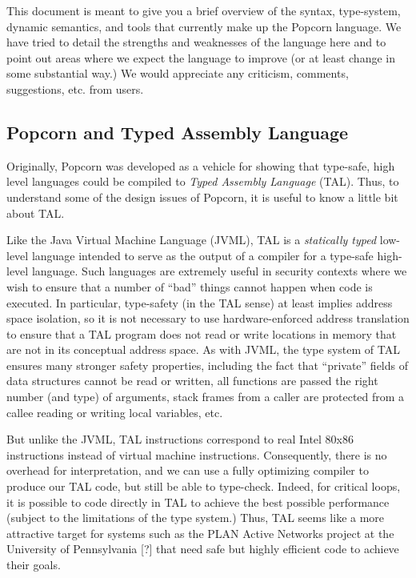 \documentclass[titlepage,10pt]{article}
\begin{document}
This document is meant to give you a brief overview of the syntax,
type-system, dynamic semantics, and tools that currently make up the
Popcorn language.  We have tried to detail the strengths and weaknesses
of the language here and to point out areas where we expect the language
to improve (or at least change in some substantial way.)  We would
appreciate any criticism, comments, suggestions, etc. from users.

\subsection{Popcorn and Typed Assembly Language}

Originally, Popcorn was developed as a vehicle for showing that
type-safe, high level languages could be compiled to \textit{Typed
Assembly Language} (TAL).   Thus, to understand some of the design
issues of Popcorn, it is useful to know a little bit about TAL.

Like the Java Virtual Machine Language (JVML), TAL is a
\textit{statically typed} low-level language intended to serve as the
output of a compiler for a type-safe high-level language.  Such
languages are extremely useful in security contexts where we wish to
ensure that a number of ``bad'' things cannot happen when code is
executed.  In particular, type-safety (in the TAL sense) at least
implies address space isolation, so it is not necessary to use
hardware-enforced address translation to ensure that a TAL program does
not read or write locations in memory that are not in its conceptual
address space.  As with JVML, the type system of TAL ensures many
stronger safety properties, including the fact that ``private'' fields
of data structures cannot be read or written, all functions are passed
the right number (and type) of arguments, stack frames from a caller are
protected from a callee reading or writing local variables, etc.

But unlike the JVML, TAL instructions correspond to real Intel 80x86
instructions instead of virtual machine instructions. Consequently,
there is no overhead for interpretation, and we can use a fully
optimizing compiler to produce our TAL code, but still be able to
type-check.  Indeed, for critical loops, it is possible to code directly
in TAL to achieve the best possible performance (subject to the
limitations of the type system.)   Thus, TAL seems like a more
attractive target for systems such as the PLAN Active Networks project
at the University of Pennsylvania [?] that need safe but highly
efficient code to achieve their goals.
\end{document}

